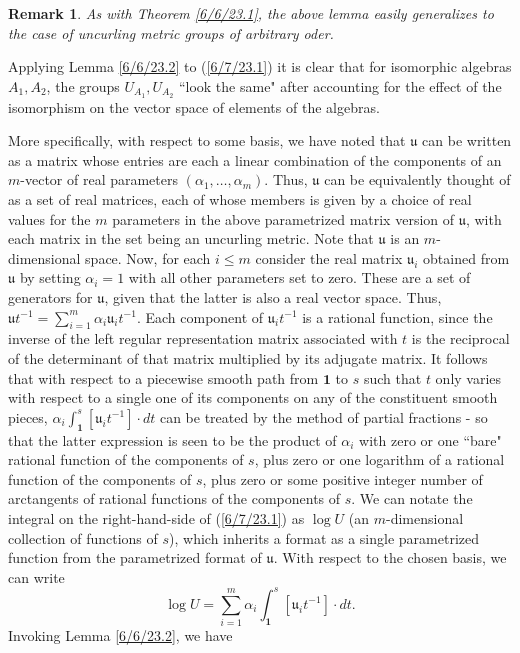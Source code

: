 \documentclass{amsart}
\numberwithin{equation}{section}
\newtheorem{remark}[theorem]{Remark}
\theoremstyle{definition}
\numberwithin{theorem}{section}
\begin{document}
\begin{remark} {\rm As with Theorem \ref{6/6/23.1}, the above lemma easily generalizes to the case of uncurling metric groups of arbitrary oder.}\end{remark}

Applying Lemma \ref{6/6/23.2} to (\ref{6/7/23.1}) it is clear that for isomorphic algebras $A_1,A_2$, the groups $ U_{A_1},  U_{A_2}$ ``look the same" after accounting for the effect of the isomorphism on the vector space of elements of the algebras.

More specifically, with respect to some basis, we have noted that $\mathfrak{u}$ can be written as a matrix whose entries are each a linear combination of the components of an $m$-vector of real parameters $(\alpha_1, \dots, \alpha_m)$.   Thus, $\mathfrak{u}$ can be equivalently thought of as a set of real matrices, each of whose members is given by a choice of real values for the $m$ parameters in the above parametrized matrix version of $\mathfrak{u}$, with each matrix in the set being an uncurling metric.   Note that $\mathfrak{u}$ is an $m$-dimensional space.    Now, for each $i\le m$ consider the real matrix  $\mathfrak{u}_i$ obtained from $\mathfrak{u}$ by setting $\alpha_i =1$ with all other parameters set to zero.  These are a set of generators for $\mathfrak{u}$, given that the latter is also a real vector space. Thus, $\mathfrak{u}t^{-1} = \sum_{i=1}^m \alpha_i \mathfrak{u}_i t^{-1}$.   Each component of $\mathfrak{u}_i t^{-1}$ is a rational function, since the inverse of the left regular representation matrix associated with $t$ is the reciprocal of the determinant of that matrix multiplied by its adjugate matrix.  It follows that  with respect to a piecewise smooth path from $\mathbf{1}$ to $s$ such that $t$ only varies with respect to a single one of its components on any of the constituent smooth pieces, $\alpha_i \int_{\mathbf{1}}^s [\mathfrak{u}_i t^{-1}]\cdot dt$ can be treated by the method of partial fractions - so that the latter expression is seen to be the product of $\alpha_i$ with zero or one ``bare" rational function of the components of $s$, plus zero or one logarithm of a rational function of the components of $s$, plus zero or some positive integer number of arctangents of rational functions of the components of $s$.  We can notate the integral on the right-hand-side of (\ref{6/7/23.1}) as $\log  U$ (an $m$-dimensional collection of functions of $s$), which inherits a format as a single parametrized function from the parametrized format of $\mathfrak{u}$.   With respect to the chosen basis, we can write \begin{equation}\label{9/26/23.1} \log  U =\sum_{i=1}^m \alpha_i \int_{\mathbf{1}}^s [\mathfrak{u}_i t^{-1}]\cdot dt.\end{equation}   Invoking Lemma \ref{6/6/23.2}, we have   
\end{document}

